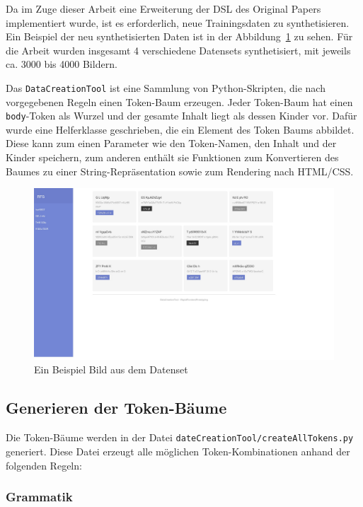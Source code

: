 \documentclass[pdftex,a4paper,halfparskip, article]{scrartcl}
\begin{document}
Da im Zuge dieser Arbeit eine Erweiterung der DSL des Original Papers implementiert wurde, ist es erforderlich, neue Trainingsdaten zu synthetisieren. Ein Beispiel der neu synthetisierten Daten ist in der Abbildung~\ref{fig:beispiel_daten} zu sehen. Für die Arbeit wurden insgesamt 4 verschiedene Datensets synthetisiert, mit jeweils ca. 3000 bis 4000 Bildern. 

Das \texttt{DataCreationTool} ist eine Sammlung von Python-Skripten, die nach vorgegebenen Regeln einen Token-Baum erzeugen. Jeder Token-Baum hat einen \texttt{body}-Token als Wurzel und der gesamte Inhalt liegt als dessen Kinder vor. Dafür wurde eine Helferklasse geschrieben, die ein Element des Token Baums abbildet. Diese kann zum einen Parameter wie den Token-Namen, den Inhalt und der Kinder speichern, zum anderen enthält sie Funktionen zum Konvertieren des Baumes zu einer String-Repräsentation sowie zum Rendering nach HTML/CSS. 

\begin{figure}[h]
\centering
\includegraphics[width=1\textwidth]{beispiel_daten}
\caption{Ein Beispiel Bild aus dem Datenset}
\label{fig:beispiel_daten}
\end{figure}

\subsection{Generieren der Token-Bäume}
Die Token-Bäume werden in der Datei \texttt{dateCreationTool/createAllTokens.py} generiert. Diese Datei erzeugt alle möglichen Token-Kombinationen anhand der folgenden Regeln:

\subsubsection{Grammatik}
\end{document}
